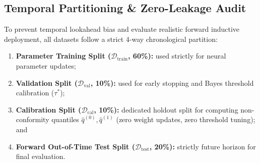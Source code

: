 \begin{table}[t]
\centering
\caption{Structural Overview of the 14 Benchmark Financial Networks across Topological Archetypes.}
\label{tab:dataset_corpus}
\renewcommand{\arraystretch}{0.85}
\setlength{\tabcolsep}{3.5pt}
\end{table}

\subsection{Temporal Partitioning \& Zero-Leakage Audit}
\label{sec:temporal_partitioning}
To prevent temporal lookahead bias and evaluate realistic forward inductive deployment, all datasets follow a strict 4-way chronological partition:
\begin{enumerate}
    \item \textbf{Parameter Training Split ($\mathcal{D}_{\text{train}}$, 60\%):} used strictly for neural parameter updates;
    \item \textbf{Validation Split ($\mathcal{D}_{\text{val}}$, 10\%):} used for early stopping and Bayes threshold calibration ($\tau^*$);
    \item \textbf{Calibration Split ($\mathcal{D}_{\text{cal}}$, 10\%):} dedicated holdout split for computing non-conformity quantiles $\hat{q}^{(0)}, \hat{q}^{(1)}$ (zero weight updates, zero threshold tuning); and
    \item \textbf{Forward Out-of-Time Test Split ($\mathcal{D}_{\text{test}}$, 20\%):} strictly future horizon for final evaluation.
\end{enumerate}

